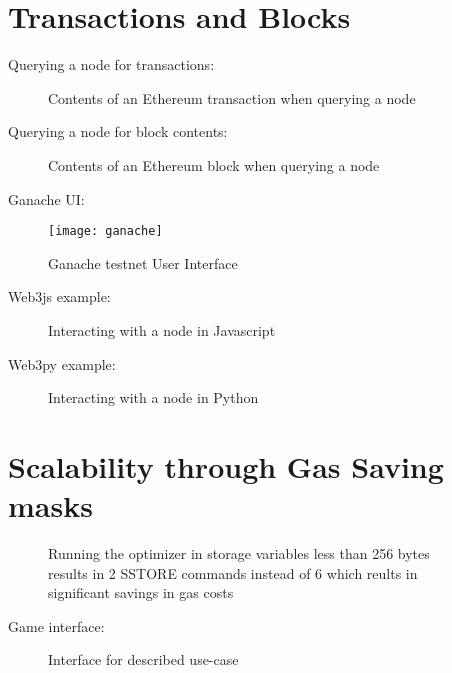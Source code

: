\begin{appendices}

\chapter{Transactions and Blocks}
Querying a node for transactions:
\begin{figure}[H]
    \centering
    
    \caption{Contents of an Ethereum transaction when querying a node}
    \label{fig:transaction}
\end{figure}

Querying a node for block contents:
\begin{figure}[H]
    \centering
    
    \caption{Contents of an Ethereum block when querying a node}
    \label{fig:block}
\end{figure}

Ganache UI:
\begin{figure}[H]
    \centering
    \texttt{[image: ganache]}
    \caption{Ganache testnet User Interface}
    \label{fig:ganache}
    
\end{figure}

Web3js example:
\begin{figure}[H]
    \centering
    
    \caption{Interacting with a node in Javascript}
    \label{fig:web3js}
\end{figure}

Web3py example:
\begin{figure}[H]
    \centering
    
    \caption{Interacting with a node in Python}
    \label{fig:web3py}
\end{figure}

\chapter{Scalability through Gas Saving masks} \label{apx:scalability}

\begin{figure}[H]
  \begin{subfigure}[b]{\textwidth}
    \centering
    
  \end{subfigure}

  \begin{subfigure}[b]{\textwidth}
    \centering
    
  \end{subfigure}
  \caption{Running the optimizer in storage variables less than 256 bytes results in 2 SSTORE commands instead of 6 which reults in significant savings in gas costs}
  \label{fig:struct_optimization}
\end{figure}
Game interface:
\begin{figure}[H]
    \centering
    
    \caption{Interface for described use-case}
    \label{fig:game_interface}
\end{figure}


\end{appendices}
